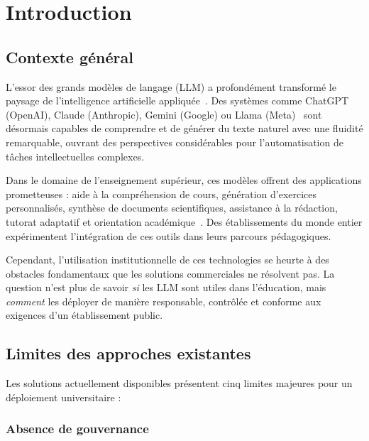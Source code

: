 \documentclass[12pt, a4paper]{article}
\newcommand{\acrshort}[1]{\MakeUppercase{#1}}
\begin{document}
\section{Introduction}
\label{chap:introduction}

\subsection{Contexte général}

L'essor des grands modèles de langage (\acrshort{llm}) a profondément transformé le paysage de l'intelligence artificielle appliquée~\cite{kasneci2023chatgpt}. Des systèmes comme ChatGPT (OpenAI), Claude (Anthropic), Gemini (Google) ou Llama (Meta)~\cite{touvron2023llama} sont désormais capables de comprendre et de générer du texte naturel avec une fluidité remarquable, ouvrant des perspectives considérables pour l'automatisation de tâches intellectuelles complexes.

Dans le domaine de l'enseignement supérieur, ces modèles offrent des applications prometteuses : aide à la compréhension de cours, génération d'exercices personnalisés, synthèse de documents scientifiques, assistance à la rédaction, tutorat adaptatif et orientation académique~\cite{kasneci2023chatgpt}. Des établissements du monde entier expérimentent l'intégration de ces outils dans leurs parcours pédagogiques.

Cependant, l'utilisation institutionnelle de ces technologies se heurte à des obstacles fondamentaux que les solutions commerciales ne résolvent pas. La question n'est plus de savoir \textit{si} les \acrshort{llm} sont utiles dans l'éducation, mais \textit{comment} les déployer de manière responsable, contrôlée et conforme aux exigences d'un établissement public.

\subsection{Limites des approches existantes}

Les solutions actuellement disponibles présentent cinq limites majeures pour un déploiement universitaire :

\subsubsection{Absence de gouvernance}
\end{document}
